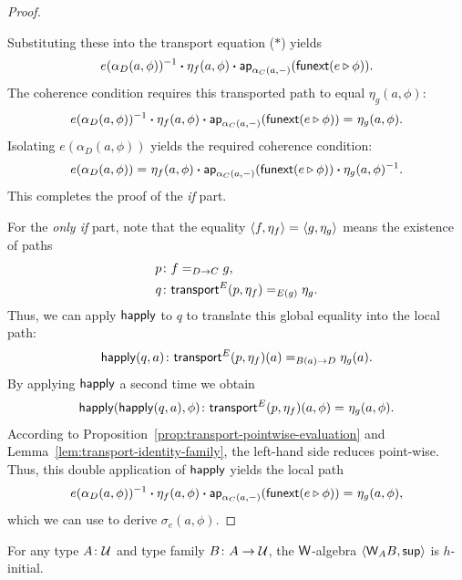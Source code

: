 \begin{proof}
\begin{enumerate}[a),font=\upshape]
    \end{enumerate}
    Substituting these into the transport equation ($\ast$) yields
    \[
        e(\alpha_D(a,\phi))^{-1}
        \mathbin{\boldsymbol{\cdot}}\eta_f(a,\phi)
        \mathbin{\boldsymbol{\cdot}}\mathsf{ap}_{\alpha_C(a,{\mathord-})}
            (
                \mathsf{funext}(e\triangleright\phi)
            ).
    \]
    The coherence condition requires this transported path to equal $\eta_g(a,\phi)$:
    \[
        e(\alpha_D(a,\phi))^{-1} \mathbin{\boldsymbol{\cdot}} \eta_f(a,\phi) \mathbin{\boldsymbol{\cdot}} \mathsf{ap}_{\alpha_C(a,{\mathord-})}(\mathsf{funext}(e\triangleright\phi)) \mathrel{=_{}} \eta_g(a,\phi).
    \]
    Isolating $e(\alpha_D(a,\phi))$ yields the required coherence condition:
    \[
        e(\alpha_D(a,\phi))
        \mathrel{=_{}}
        \eta_f(a,\phi)
            \mathbin{\boldsymbol{\cdot}}\mathsf{ap}_{\alpha_C(a,{\mathord-})}
                (
                    \mathsf{funext}(e\triangleright\phi)
                )
            \mathbin{\boldsymbol{\cdot}}\eta_g(a,\phi)^{-1}.
    \]
    This completes the proof of the \textit{if} part.
    
    For the \textit{only if} part, note that the equality $\langle f,\eta_f\rangle\mathrel{=_{}}\langle g,\eta_g\rangle$ means the existence of paths
    \begin{align*}
        p&\colon f\eq{D\to C}g,\\
        q&\colon
            \fun{transport}^E(p,\eta_f)
            \eq{E(g)}
            \eta_g.
    \end{align*}
    Thus, we can apply $\mathsf{happly}$ to $q$ to translate this global equality into the local path:
    \[
        \fun{happly}(q,a)\colon
            \fun{transport}^E(p,\eta_f)(a)
            \eq{B(a)\to D}
            \eta_g(a).
    \]
    By applying $\mathsf{happly}$ a second time we obtain
    \[
        \fun{happly}(\fun{happly}(q,a),\phi)\colon
        \fun{transport}^E(p,\eta_f)(a,\phi)
        \eq{}
        \eta_g(a,\phi).
    \]
    According to Proposition~\ref{prop:transport-pointwise-evaluation} and Lemma~\ref{lem:transport-identity-family}, the left-hand side reduces point-wise. Thus, this double application of $\mathsf{happly}$ yields the local path 
    \[
        e(\alpha_D(a,\phi))^{-1}
        \mathbin{\boldsymbol{\cdot}}\eta_f(a,\phi)
        \mathbin{\boldsymbol{\cdot}}\mathsf{ap}_{\alpha_C(a,{\mathord-})}
            (
                \mathsf{funext}(e\triangleright\phi)
            )\mathrel{=_{}}\eta_g(a,\phi),
    \]
    which we can use to derive $\sigma_e(a,\phi)$.
\end{proof}

\begin{thm}
    For any type\/ $A\colon\univ$ and type family\/ $B\colon A\to\univ$, the\/ $\mathsf{W}$-algebra\/ $\langle\mathsf{W}_AB,\mathsf{sup}\rangle$ is\/ $h$-initial.
\end{thm}


